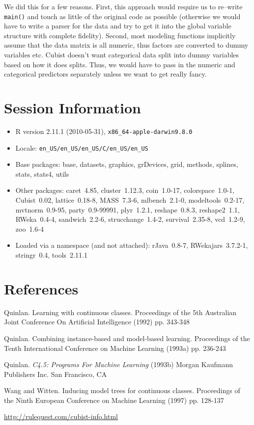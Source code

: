 \documentclass[12pt]{article}
\newcommand{\code}[1]{\mbox{\footnotesize\color{darkblue}\texttt{#1}}}
\begin{document}
We did this for a few reasons. First, this approach would require us to re--write \code{main()} and touch as little of the
original code as possible (otherwise we would have to write a parser for the
data and try to get it into the global variable structure with complete fidelity). Second, 
most modeling functions implicitly assume that the data matrix is all numeric,
thus factors are converted to dummy variables etc. Cubist doesn't want categorical
data split into dummy variables based on how it does splits. Thus, we would have
to pass in the numeric and categorical predictors separately unless we want to
get really fancy.


\section{Session Information}

\begin{itemize}\raggedright
  \item R version 2.11.1 (2010-05-31), \verb|x86_64-apple-darwin9.8.0|
  \item Locale: \verb|en_US/en_US/en_US/C/en_US/en_US|
  \item Base packages: base, datasets, graphics, grDevices, grid, methods, splines, stats, stats4, utils
  \item Other packages: caret~4.85, cluster~1.12.3, coin~1.0-17, colorspace~1.0-1, Cubist~0.02, lattice~0.18-8, MASS~7.3-6,
    mlbench~2.1-0, modeltools~0.2-17, mvtnorm~0.9-95, party~0.9-99991, plyr~1.2.1, reshape~0.8.3, reshape2~1.1, RWeka~0.4-4,
    sandwich~2.2-6, strucchange~1.4-2, survival~2.35-8, vcd~1.2-9, zoo~1.6-4
  \item Loaded via a namespace (and not attached): rJava~0.8-7, RWekajars~3.7.2-1, stringr~0.4, tools~2.11.1
\end{itemize}
\section{References}

\begin{description}
   \item Quinlan. Learning with continuous classes. Proceedings of the 5th Australian Joint Conference On Artificial Intelligence (1992) pp. 343-348

   \item Quinlan. Combining instance-based and model-based learning. Proceedings of the Tenth International Conference on Machine Learning (1993a) pp. 236-243

   \item Quinlan. {\it C4.5: Programs For Machine Learning} (1993b) Morgan Kaufmann Publishers Inc. San Francisco, CA

   \item Wang and Witten. Inducing model trees for continuous classes. Proceedings of the Ninth European Conference on Machine Learning (1997) pp. 128-137

  
     
   \item \href{http://rulequest.com/cubist-info.html}{http://rulequest.com/cubist-info.html}
\end{description}
\end{document}

